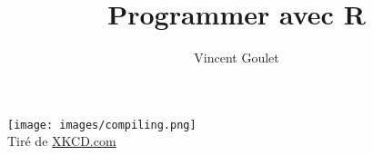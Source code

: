 \documentclass[letterpaper,11pt,x11names,english,french]{memoir}
\title{Programmer avec R}
\author{Vincent Goulet}
\theoremstyle{remark}
\begin{document}
\frontmatter

\pagestyle{empty}


\null\cleardoublepage           %


\clearpage

\pagestyle{companion}



\tableofcontents*
\cleartorecto
\listoftables*
\cleartorecto
\listoffigures*

\cleartoverso
\thispagestyle{empty}
\begin{vplace}[0.45]
  \centering
  \begin{minipage}{0.9\linewidth}
    \texttt{[image: images/compiling.png]} \\
    \footnotesize\sffamily%
    Tiré de \href{http://xkcd.com/303/}{XKCD.com}
  \end{minipage}
\end{vplace}

\mainmatter














%

\appendix






\cleardoublepage
\printindex

\pagestyle{empty}

\cleartoverso


\cleartoverso

\end{document}
